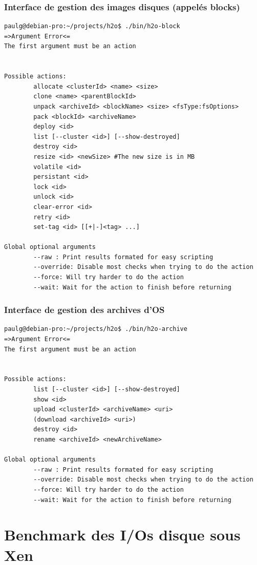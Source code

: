 \subsection{Interface de gestion des images disques (appelés blocks)}

\begin{lstlisting}
paulg@debian-pro:~/projects/h2o$ ./bin/h2o-block
=>Argument Error<=
The first argument must be an action


Possible actions:
        allocate <clusterId> <name> <size>
        clone <name> <parentBlockId>
        unpack <archiveId> <blockName> <size> <fsType:fsOptions>
        pack <blockId> <archiveName>
        deploy <id>
        list [--cluster <id>] [--show-destroyed]
        destroy <id>
        resize <id> <newSize> #The new size is in MB
        volatile <id>
        persistant <id>
        lock <id>
        unlock <id>
        clear-error <id>
        retry <id>
        set-tag <id> [[+|-]<tag> ...]

Global optional arguments
        --raw : Print results formated for easy scripting
        --override: Disable most checks when trying to do the action
        --force: Will try harder to do the action
        --wait: Wait for the action to finish before returning
\end{lstlisting}

\subsection{Interface de gestion des archives d'OS}

\begin{lstlisting}
paulg@debian-pro:~/projects/h2o$ ./bin/h2o-archive
=>Argument Error<=
The first argument must be an action


Possible actions:
        list [--cluster <id>] [--show-destroyed]
        show <id>
        upload <clusterId> <archiveName> <uri>
        (download <archiveId> <uri>)
        destroy <id>
        rename <archiveId> <newArchiveName>

Global optional arguments
        --raw : Print results formated for easy scripting
        --override: Disable most checks when trying to do the action
        --force: Will try harder to do the action
        --wait: Wait for the action to finish before returning
\end{lstlisting}

\chapter{Benchmark des I/Os disque sous Xen}

